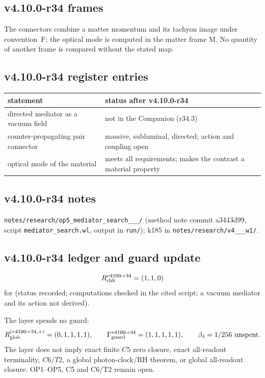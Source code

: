\subsection*{v4.10.0-r34 frames}
\label{subsec:v4100-r34-frames}

The connectors combine a matter momentum and its tachyon image under convention~F; the optical mode is computed in the matter frame M.  No
quantity of another frame is compared without the stated map.

\subsection*{v4.10.0-r34 register entries}
\label{subsec:v4100-r34-register}

\begin{center}
\small
\begin{tabular}{@{}>{\raggedright\arraybackslash}p{}>{\raggedright\arraybackslash}p{}@{}}
\toprule
statement & status after v4.10.0-r34\\
\midrule
directed mediator as a vacuum field & not in the Companion (r34.3)\\
counter-propagating pair connector & massive, subluminal, directed; action and coupling open\\
optical mode of the material & meets all requirements; makes the contrast a material property\\
\bottomrule
\end{tabular}
\end{center}

\subsection*{v4.10.0-r34 notes}
\label{subsec:v4100-r34-notes}

\texttt{notes/\allowbreak research/\allowbreak op5\_\allowbreak mediator\_\allowbreak search\_\_\_/} (method note commit a3443d99,
script \texttt{mediator\_\allowbreak search.wl}, output in \texttt{run/}); k185 in \texttt{notes/\allowbreak research/\allowbreak v4\_\_\_\allowbreak w1/}.

\subsection*{v4.10.0-r34 ledger and guard update}
\label{subsec:v4100-r34-ledger-guard}

\[
R_{\rm chk}^{v4100\text{-}r34}=(1,1,0)
\]
for (status recorded; computations checked in the cited script; a vacuum mediator and its action not derived).

The layer spends no guard:
\[
R_{\rm glob}^{(v4100\text{-}r34,+)}=(0,1,1,1,1),
\qquad
\Gamma_{\rm guard}^{v4100\text{-}r34}=(1,1,1,1,1),
\qquad
\beta_4=1/256\ \text{unspent}.
\]
The layer does not imply exact finite \(C5\) zero closure, exact all-readout terminality, \(C6/T2\), a global photon-clock/RH theorem,
or global all-readout closure.  OP1--OP5, C5 and C6/T2 remain open.
